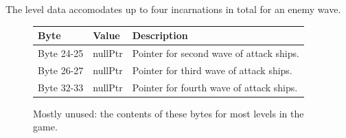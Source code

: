 The level data accomodates up to four incarnations in total for an enemy wave.

\begin{figure}[H]

  {
    \setlength{\tabcolsep}{3.0pt}
    \setlength\cmidrulewidth{\heavyrulewidth} %
    \begin{adjustbox}{width=13cm}

      \begin{tabular}{lll}
        \toprule
        Byte    & Value                     & Description                                                        \\
        \midrule
 Byte 24-25 & nullPtr\index{nullPtr}                   & Pointer for second wave of attack ships.                            \\
 Byte 26-27 & nullPtr\index{nullPtr}                   & Pointer for third wave of attack ships.                             \\
 Byte 32-33 & nullPtr                       & Pointer for fourth wave of attack ships.                            \\
        \bottomrule
      \end{tabular}
    \end{adjustbox}
  }\caption{Mostly unused: the contents of these bytes for most levels in the game.}
\end{figure}

